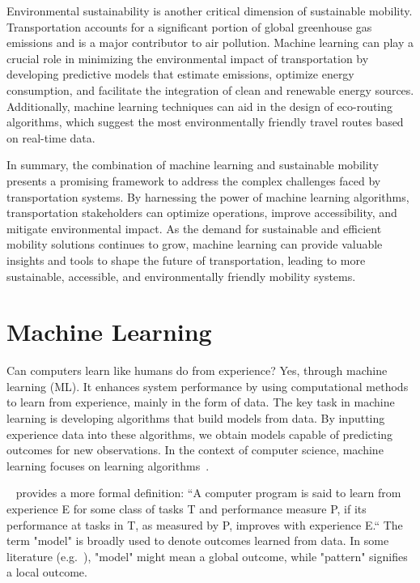 Environmental sustainability is another critical dimension of sustainable mobility. Transportation accounts for a significant portion of global greenhouse gas emissions and is a major contributor to air pollution. Machine learning can play a crucial role in minimizing the environmental impact of transportation by developing predictive models that estimate emissions, optimize energy consumption, and facilitate the integration of clean and renewable energy sources. Additionally, machine learning techniques can aid in the design of eco-routing algorithms, which suggest the most environmentally friendly travel routes based on real-time data.

In summary, the combination of machine learning and sustainable mobility presents a promising framework to address the complex challenges faced by transportation systems. By harnessing the power of machine learning algorithms, transportation stakeholders can optimize operations, improve accessibility, and mitigate environmental impact. As the demand for sustainable and efficient mobility solutions continues to grow, machine learning can provide valuable insights and tools to shape the future of transportation, leading to more sustainable, accessible, and environmentally friendly mobility systems.


\section{Machine Learning}
\label{sec:intro:motivation}

Can computers learn like humans do from experience? Yes, through machine learning (ML).
It enhances system performance by using computational methods to learn 
from experience, mainly in the form of data. The key task in machine learning is developing
algorithms that build models from data. By inputting experience data into these algorithms,
we obtain models capable of predicting outcomes for new observations. In the context of
computer science, machine learning focuses on learning algorithms~\cite{zhou2021machine}.


~\cite{mitchell1997machine} provides a more formal definition: 
``A computer program is said to learn from experience E for some class of tasks T and performance measure P, 
if its performance at tasks in T, as measured by P, improves with experience E.``
The term "model" is broadly used to denote outcomes learned from data. In some literature 
(e.g.~\cite{hand2001principles}), "model" might mean a global outcome, while "pattern" signifies a local outcome.

